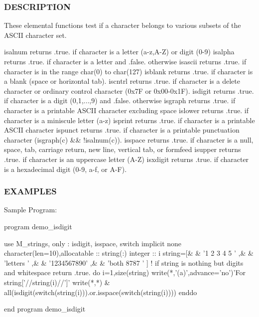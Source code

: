 \subsubsection*{D\+E\+S\+C\+R\+I\+P\+T\+I\+ON}

\begin{DoxyVerb}These elemental functions test if a character belongs to various subsets of the ASCII character set.

    isalnum    returns .true. if character is a letter (a-z,A-Z) or digit (0-9)
    isalpha    returns .true. if character is a letter and .false. otherwise
    isascii    returns .true. if character is in the range char(0) to char(127)
    isblank    returns .true. if character is a blank (space or horizontal tab).
    iscntrl    returns .true. if character is a delete character or ordinary control character (0x7F or 0x00-0x1F).
    isdigit    returns .true. if character is a digit (0,1,...,9) and .false. otherwise
    isgraph    returns .true. if character is a printable ASCII character excluding space
    islower    returns .true. if character is a miniscule letter (a-z)
    isprint    returns .true. if character is a printable ASCII character
    ispunct    returns .true. if character is a printable punctuation character (isgraph(c) && !isalnum(c)).
    isspace    returns .true. if character is a null, space, tab, carriage return, new line, vertical tab, or formfeed
    isupper    returns .true. if character is an uppercase letter (A-Z)
    isxdigit   returns .true. if character is a hexadecimal digit (0-9, a-f, or A-F).
\end{DoxyVerb}


\subsubsection*{E\+X\+A\+M\+P\+L\+ES}

Sample Program\+:

program demo\+\_\+isdigit \begin{DoxyVerb} use M_strings, only : isdigit, isspace, switch
 implicit none
 character(len=10),allocatable :: string(:)
 integer                       :: i
    string=[&
    & '1 2 3 4 5 ' ,&
    & 'letters   ' ,&
    & '1234567890' ,&
    & 'both 8787 ' ]
    ! if string is nothing but digits and whitespace return .true.
    do i=1,size(string)
       write(*,'(a)',advance='no')'For string['//string(i)//']'
       write(*,*) &
       all(isdigit(switch(string(i))).or.isspace(switch(string(i))))
    enddo

 end program demo_isdigit
\end{DoxyVerb}



